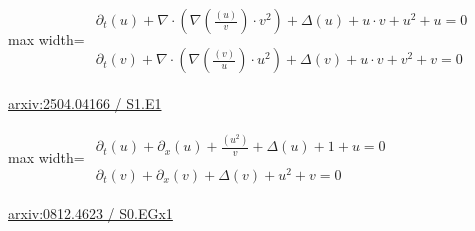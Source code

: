 \documentclass[10pt,a4paper]{article}
\begin{document}
\begin{minipage}{\linewidth}
\begin{center}\begin{adjustbox}{max width=\linewidth}$\displaystyle\begin{gathered}\begin{gathered}\partial_{t}(u)+\nabla\cdot(\nabla(\frac{(u)}{v})\cdot v^{2})+\Delta(u)+u\cdot v+u^{2}+u=0\end{gathered}\\[5pt]\begin{gathered}\partial_{t}(v)+\nabla\cdot(\nabla(\frac{(v)}{u})\cdot u^{2})+\Delta(v)+u\cdot v+v^{2}+v=0\end{gathered}\end{gathered}$\end{adjustbox}\end{center}
{\small \href{https://arxiv.org/html/2504.04166#S1.E1}{arxiv:2504.04166 / S1.E1}}\par
\end{minipage}\par\vspace{7mm}

\begin{minipage}{\linewidth}
\begin{center}\begin{adjustbox}{max width=\linewidth}$\displaystyle\begin{gathered}\begin{gathered}\partial_{t}(u)+\partial_{x}(u)+\frac{(u^{2})}{v}+\Delta(u)+1+u=0\end{gathered}\\[5pt]\begin{gathered}\partial_{t}(v)+\partial_{x}(v)+\Delta(v)+u^{2}+v=0\end{gathered}\end{gathered}$\end{adjustbox}\end{center}
{\small \href{https://arxiv.org/html/0812.4623#S0.EGx1}{arxiv:0812.4623 / S0.EGx1}}\par
\end{minipage}\par\vspace{7mm}
\end{document}
